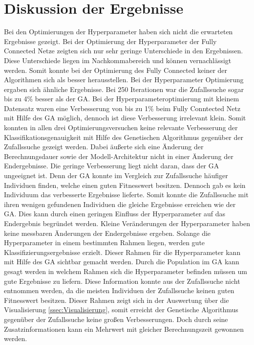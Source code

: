 \section{Diskussion der Ergebnisse}
Bei den Optimierungen der Hyperparameter haben sich nicht die erwarteten Ergebnisse gezeigt. Bei der Optimierung der Hyperparameter der Fully Connected Netze zeigten sich nur sehr geringe Unterschiede in den Ergebnissen. Diese Unterschiede liegen im Nachkommabereich und können vernachlässigt werden. Somit konnte bei der Optimierung des Fully Connected keiner der Algorithmen sich als besser herausstellen. Bei der Hyperparameter Optimierung ergaben sich ähnliche Ergebnisse. Bei 250 Iterationen war die Zufallssuche sogar bis zu 4\% besser als der GA. Bei der Hyperparameteroptimierung mit kleinem Datensatz waren eine Verbesserung von bis zu 1\% beim Fully Conntected Netz mit Hilfe des GA möglich, dennoch ist diese Verbesserung irrelevant klein. Somit konnten in allen drei Optimierungsversuchen keine relevante Verbesserung der Klassifikationsgenauigkeit mit Hilfe des Genetischen Algorithmus gegenüber der Zufallssuche gezeigt werden. Dabei äußerte sich eine Änderung der Berechnungsdauer sowie der Modell-Architektur nicht in einer Änderung der Endergebnisse. Die geringe Verbesserung liegt nicht daran, dass der GA ungeeignet ist. Denn der GA konnte im Vergleich zur Zufallssuche häufiger Individuen finden, welche einen guten Fitnesswert besitzen. Dennoch gab es kein Individuum das verbesserte Ergebnisse lieferte. Somit konnte die Zufallssuche mit ihren wenigen gefundenen Individuen die gleiche Ergebnisse erreichen wie der GA. Dies kann durch einen geringen Einfluss der Hyperparameter auf das Endergebnis begründet werden. Kleine Veränderungen der Hyperparameter haben keine messbaren Änderungen der Endergebnisse ergeben. Solange die Hyperparameter in einem bestimmten Rahmen liegen, werden gute Klassifizierungsergebnisse erzielt. Dieser Rahmen für die Hyperparameter kann mit Hilfe des GA sichtbar gemacht werden. Durch die Population im GA kann gesagt werden in welchem Rahmen sich die Hyperparameter befinden müssen um gute Ergebnisse zu liefern. Diese Information konnte aus der Zufallssuche nicht entnommen werden, da die meisten Individuen der Zufallssuche keinen guten Fitnesswert besitzen. Dieser Rahmen zeigt sich in der Auswertung über die Visualisierung \ref{ssec:Visualisierung}, somit erreicht der Genetische Algorithmus gegenüber der Zufallssuche keine großen Verbesserungen. Doch durch seine Zusatzinformationen kann ein Mehrwert mit gleicher Berechnungszeit gewonnen werden.

